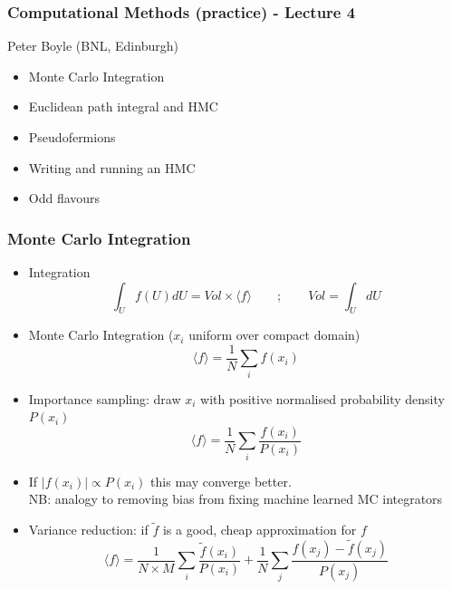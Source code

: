\documentclass[pdf,ps,8pt]{beamer}
\begin{document}
\begin{frame}[fragile]\small\frametitle{  Computational Methods (practice) -  Lecture 4    }

  \begin{center}
 
  {\color{red} Peter Boyle} (BNL, Edinburgh)

  \begin{itemize}
  \item Monte Carlo Integration
  \item Euclidean path integral and HMC
  \item Pseudofermions
  \item Writing and running an HMC
  \item Odd flavours
  \end{itemize}

\end{center}  
\end{frame}

\begin{frame}[fragile]\small\frametitle{Monte Carlo Integration}
\begin{itemize}
\item Integration
  $$
  \int_U f(U) dU =  Vol \times \langle f \rangle  \quad \quad ; \quad \quad Vol = \int_U dU
  $$
\item Monte Carlo Integration ($x_i$ uniform over compact domain)
  $$
  \langle f \rangle = \frac{1}{N}\sum\limits_i f(x_i)
  $$
\item Importance sampling: draw $x_i$ with positive normalised probability density $P(x_i)$
  $$
  \langle f \rangle = \frac{1}{N}\sum\limits_i \frac{f(x_i)}{P(x_i)}
  $$
\item If $|f(x_i)| \propto P(x_i)$ this may converge better. \\
      NB: analogy to removing bias from fixing machine learned MC integrators\\
\item Variance reduction: if $\tilde{f}$ is a good, cheap approximation for $f$
  $$
  \langle f \rangle = \frac{1}{N\times M}\sum\limits_i \frac{\tilde{f}(x_i)}{P(x_i)}
                    + \frac{1}{N}\sum\limits_j \frac{f(x_j) - \tilde{f}(x_j)}{P(x_j)}
  $$
\end{itemize}
\end{frame}
\end{document}
